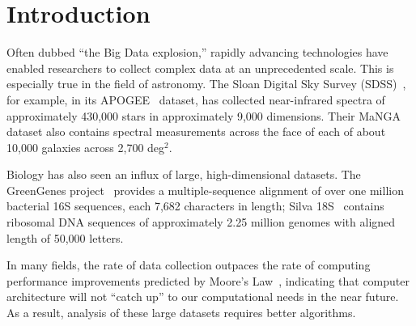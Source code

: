 \section{Introduction}
\label{sec:introduction}

Often dubbed ``the Big Data explosion,'' rapidly advancing technologies have enabled researchers to collect complex data at an unprecedented scale. 
This is especially true in the field of astronomy. 
The Sloan Digital Sky Survey (SDSS)~\cite{blanton2017sdss}, for example, in its APOGEE~\cite{alam2015eleventh} dataset, has collected near-infrared spectra of approximately 430,000 stars in approximately 9,000 dimensions. 
Their MaNGA dataset also contains spectral measurements across the face of each of about 10,000 galaxies across 2,700 deg$^2$. 

Biology has also seen an influx of large, high-dimensional datasets.
The GreenGenes project~\cite{desantis2006greengenes} provides a multiple-sequence alignment of over one million bacterial 16S sequences, each 7,682 characters in length;
Silva 18S~\cite{10.1093/nar/gks1219} contains ribosomal DNA sequences of approximately 2.25 million genomes with aligned length of 50,000 letters.


In many fields, the rate of data collection outpaces the rate of computing performance improvements predicted by Moore's Law~\cite{brescia2012extracting}, indicating that computer architecture will not ``catch up'' to our computational needs in the near future.
As a result, analysis of these large datasets requires better algorithms. 

